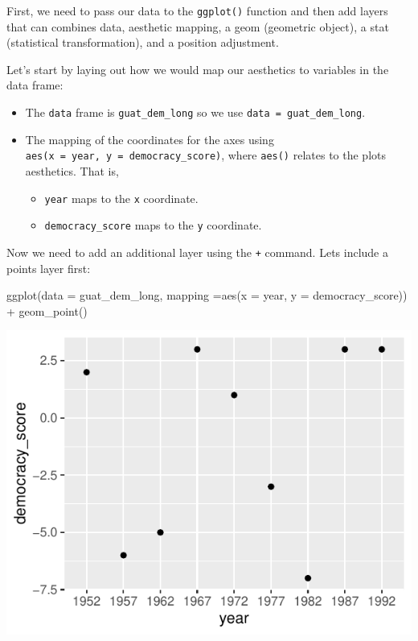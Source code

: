 \documentclass[
  letterpaper,
  DIV=11,
  numbers=noendperiod]{scrartcl}
\newenvironment{Shaded}{\begin{snugshade}}{\end{snugshade}}
\newcommand{\AttributeTok}[1]{\textcolor[rgb]{0.40,0.45,0.13}{#1}}
\newcommand{\FunctionTok}[1]{\textcolor[rgb]{0.28,0.35,0.67}{#1}}
\newcommand{\NormalTok}[1]{\textcolor[rgb]{0.00,0.23,0.31}{#1}}
\newcommand{\SpecialCharTok}[1]{\textcolor[rgb]{0.37,0.37,0.37}{#1}}
\providecommand{\tightlist}{%
  \setlength{\itemsep}{0pt}\setlength{\parskip}{0pt}}\usepackage{longtable,booktabs,array}
\begin{document}
First, we need to pass our data to the \texttt{ggplot()} function and
then add layers that can combines data, aesthetic mapping, a geom
(geometric object), a stat (statistical transformation), and a position
adjustment.

Let's start by laying out how we would map our aesthetics to variables
in the data frame:

\begin{itemize}
\tightlist
\item
  The \texttt{data} frame is \texttt{guat\_dem\_long} so we use
  \texttt{data\ =\ guat\_dem\_long}.
\item
  The mapping of the coordinates for the axes using
  \texttt{aes(x\ =\ year,\ y\ =\ democracy\_score)}, where
  \texttt{aes()} relates to the plots aesthetics. That is,

  \begin{itemize}
  \tightlist
  \item
    \texttt{year} maps to the \texttt{x} coordinate.
  \item
    \texttt{democracy\_score} maps to the \texttt{y} coordinate.
  \end{itemize}
\end{itemize}

Now we need to add an additional layer using the \texttt{+} command.
Lets include a points layer first:

\begin{Shaded}
\begin{Highlighting}[]
\FunctionTok{ggplot}\NormalTok{(}\AttributeTok{data =}\NormalTok{ guat\_dem\_long, }\AttributeTok{mapping =}\FunctionTok{aes}\NormalTok{(}\AttributeTok{x =}\NormalTok{ year, }\AttributeTok{y =}\NormalTok{ democracy\_score)) }\SpecialCharTok{+}
  \FunctionTok{geom\_point}\NormalTok{()}
\end{Highlighting}
\end{Shaded}

\begin{center}
\includegraphics{notes_files/figure-pdf/Scatterplot Democracy vs. year-1.pdf}
\end{center}
\end{document}
